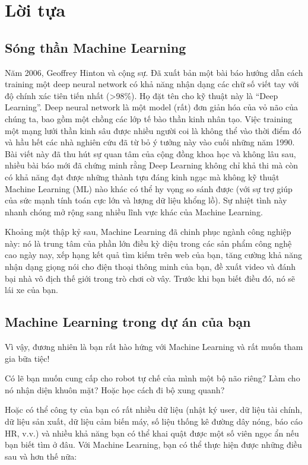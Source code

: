 \section{Lời tựa}

\subsection{Sóng thần Machine Learning}

Năm 2006, Geoffrey Hinton và cộng sự. Đã xuất bản một bài báo hướng dẫn cách training một deep neural network có khả năng nhận dạng các chữ số viết tay với độ chính xác tiên tiến nhất (>98\%). Họ đặt tên cho kỹ thuật này là “Deep Learning”. Deep neural network là một model (rất) đơn giản hóa của vỏ não của chúng ta, bao gồm một chồng các lớp tế bào thần kinh nhân tạo. Việc training một mạng lưới thần kinh sâu được nhiều người coi là không thể vào thời điểm đó và hầu hết các nhà nghiên cứu đã từ bỏ ý tưởng này vào cuối những năm 1990. Bài viết này đã thu hút sự quan tâm của cộng đồng khoa học và không lâu sau, nhiều bài báo mới đã chứng minh rằng Deep Learning không chỉ khả thi mà còn có khả năng đạt được những thành tựu đáng kinh ngạc mà không kỹ thuật Machine Learning (ML) nào khác có thể hy vọng so sánh được (với sự trợ giúp của sức mạnh tính toán cực lớn và lượng dữ liệu khổng lồ). Sự nhiệt tình này nhanh chóng mở rộng sang nhiều lĩnh vực khác của Machine Learning.

Khoảng một thập kỷ sau, Machine Learning đã chinh phục ngành công nghiệp này: nó là trung tâm của phần lớn điều kỳ diệu trong các sản phẩm công nghệ cao ngày nay, xếp hạng kết quả tìm kiếm trên web của bạn, tăng cường khả năng nhận dạng giọng nói cho điện thoại thông minh của bạn, đề xuất video và đánh bại nhà vô địch thế giới trong trò chơi cờ vây. Trước khi bạn biết điều đó, nó sẽ lái xe của bạn.

\subsection{Machine Learning trong dự án của bạn}

Vì vậy, đương nhiên là bạn rất hào hứng với Machine Learning và rất muốn tham gia bữa tiệc!

Có lẽ bạn muốn cung cấp cho robot tự chế của mình một bộ não riêng? Làm cho nó nhận diện khuôn mặt? Hoặc học cách đi bộ xung quanh?

Hoặc có thể công ty của bạn có rất nhiều dữ liệu (nhật ký user, dữ liệu tài chính, dữ liệu sản xuất, dữ liệu cảm biến máy, số liệu thống kê đường dây nóng, báo cáo HR, v.v.) và nhiều khả năng bạn có thể khai quật được một số viên ngọc ẩn nếu bạn biết tìm ở đâu. Với Machine Learning, bạn có thể thực hiện được những điều sau và hơn thế nữa:

